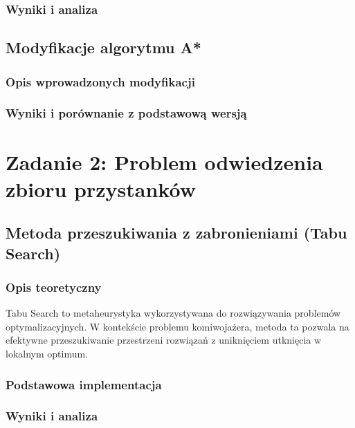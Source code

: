 \documentclass[12pt,a4paper]{article}
\begin{document}
\subsubsection{Wyniki i analiza}

\subsection{Modyfikacje algorytmu A*}
\subsubsection{Opis wprowadzonych modyfikacji}

\subsubsection{Wyniki i porównanie z podstawową wersją}

\section{Zadanie 2: Problem odwiedzenia zbioru przystanków}
\subsection{Metoda przeszukiwania z zabronieniami (Tabu Search)}
\subsubsection{Opis teoretyczny}
Tabu Search to metaheurystyka wykorzystywana do rozwiązywania problemów optymalizacyjnych. W kontekście problemu komiwojażera, metoda ta pozwala na efektywne przeszukiwanie przestrzeni rozwiązań z uniknięciem utknięcia w lokalnym optimum.

\subsubsection{Podstawowa implementacja}

\subsubsection{Wyniki i analiza}
\end{document}
